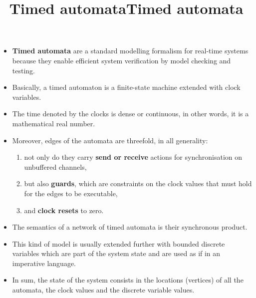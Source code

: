 \documentclass[wide]{slides}
\begin{document}
\begin{slide}
  \title{Timed automata}

  \begin{itemize}

    \item \textbf{Timed automata} are a standard modelling formalism
      for real\hyp{}time systems because they enable efficient system
      verification by model checking and testing.

    \item Basically, a timed automaton is a finite\hyp{}state machine
      extended with clock variables.

    \item The time denoted by the clocks is dense or continuous, in
      other words, it is a mathematical real number.

    \item Moreover, edges of the automata are threefold, in all
      generality:
      \begin{enumerate}

        \item not only do they carry \textbf{send or receive} actions
          for synchronisation on unbuffered channels,

        \item but also \textbf{guards}, which are constraints on the
          clock values that must hold for the edges to be executable,

        \item and \textbf{clock resets} to zero.

      \end{enumerate}
  \end{itemize}
\end{slide}

\begin{slide}
  \title{Timed automata}

  \begin{itemize}

    \item The semantics of a network of timed automata is their
      synchronous product.

    \item This kind of model is usually extended further with bounded
      discrete variables which are part of the system state and are
      used as if in an imperative language.

    \item In sum, the state of the system consists in the locations
      (vertices) of all the automata, the clock values and the
      discrete variable values.

  \end{itemize}
\end{slide}
\end{document}

